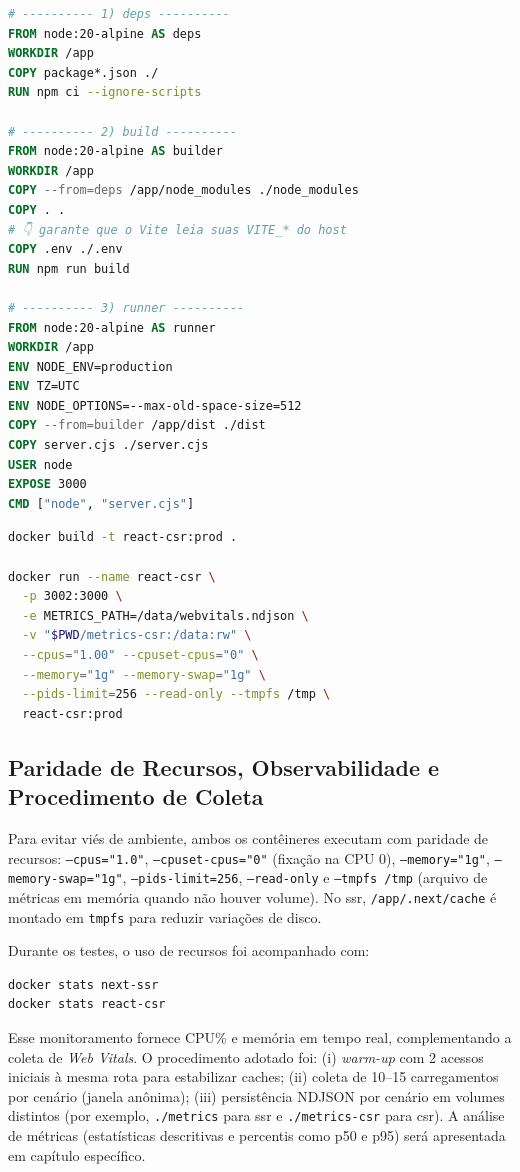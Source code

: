 \begin{lstlisting}[language=Dockerfile,caption={Dockerfile da aplicação CSR/SPA (React+Vite)}]
# ---------- 1) deps ----------
FROM node:20-alpine AS deps
WORKDIR /app
COPY package*.json ./
RUN npm ci --ignore-scripts

# ---------- 2) build ----------
FROM node:20-alpine AS builder
WORKDIR /app
COPY --from=deps /app/node_modules ./node_modules
COPY . .
# 👇 garante que o Vite leia suas VITE_* do host
COPY .env ./.env
RUN npm run build

# ---------- 3) runner ----------
FROM node:20-alpine AS runner
WORKDIR /app
ENV NODE_ENV=production
ENV TZ=UTC
ENV NODE_OPTIONS=--max-old-space-size=512
COPY --from=builder /app/dist ./dist
COPY server.cjs ./server.cjs
USER node
EXPOSE 3000
CMD ["node", "server.cjs"]
\end{lstlisting}

\begin{lstlisting}[language=bash,caption={Build e execução do container CSR com limites e volume de métricas}]
docker build -t react-csr:prod .

docker run --name react-csr \
  -p 3002:3000 \
  -e METRICS_PATH=/data/webvitals.ndjson \
  -v "$PWD/metrics-csr:/data:rw" \
  --cpus="1.00" --cpuset-cpus="0" \
  --memory="1g" --memory-swap="1g" \
  --pids-limit=256 --read-only --tmpfs /tmp \
  react-csr:prod
\end{lstlisting}

\subsection{Paridade de Recursos, Observabilidade e Procedimento de Coleta}
\label{ssec:paridade-observabilidade}

Para evitar viés de ambiente, ambos os contêineres executam com paridade de recursos: \texttt{--cpus="1.0"}, \texttt{--cpuset-cpus="0"} (fixação na CPU 0), \texttt{--memory="1g"}, \texttt{--memory-swap="1g"}, \texttt{--pids-limit=256}, \texttt{--read-only} e \texttt{--tmpfs /tmp} (arquivo de métricas em memória quando não houver volume). No \acrshort{ssr}, \texttt{/app/.next/cache} é montado em \texttt{tmpfs} para reduzir variações de disco.

Durante os testes, o uso de recursos foi acompanhado com:
\begin{lstlisting}[language=bash]
docker stats next-ssr
docker stats react-csr
\end{lstlisting}
Esse monitoramento fornece CPU\% e memória em tempo real, complementando a coleta de \textit{Web Vitals}. O procedimento adotado foi:
(i) \textit{warm-up} com 2 acessos iniciais à mesma rota para estabilizar caches;
(ii) coleta de 10--15 carregamentos por cenário (janela anônima);
(iii) persistência NDJSON por cenário em volumes distintos (por exemplo, \texttt{./metrics} para \acrshort{ssr} e \texttt{./metrics-csr} para \acrshort{csr}).
A análise de métricas (estatísticas descritivas e percentis como p50 e p95) será apresentada em capítulo específico.

